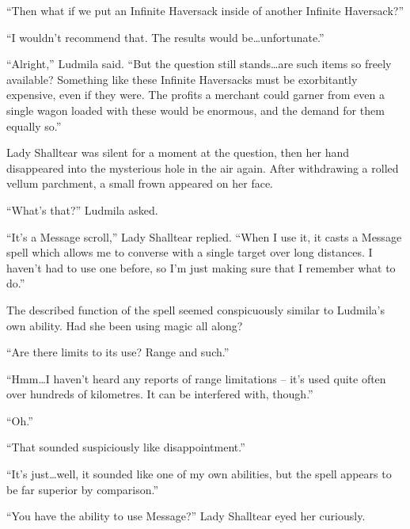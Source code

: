  

“Then what if we put an Infinite Haversack inside of another Infinite Haversack?”

 

“I wouldn’t recommend that. The results would be…unfortunate.”

 

“Alright,” Ludmila said. “But the question still stands…are such items so freely available? Something like these Infinite Haversacks must be exorbitantly expensive, even if they were. The profits a merchant could garner from even a single wagon loaded with these would be enormous, and the demand for them equally so.”

 

Lady Shalltear was silent for a moment at the question, then her hand disappeared into the mysterious hole in the air again. After withdrawing a rolled vellum parchment, a small frown appeared on her face.

 

“What’s that?” Ludmila asked.

 

“It’s a Message scroll,” Lady Shalltear replied. “When I use it, it casts a Message spell which allows me to converse with a single target over long distances. I haven’t had to use one before, so I’m just making sure that I remember what to do.”

 

The described function of the spell seemed conspicuously similar to Ludmila’s own ability. Had she been using magic all along?

 

“Are there limits to its use? Range and such.”

 

“Hmm…I haven’t heard any reports of range limitations – it’s used quite often over hundreds of kilometres. It can be interfered with, though.”

 

“Oh.”

 

“That sounded suspiciously like disappointment.”

 

“It’s just…well, it sounded like one of my own abilities, but the spell appears to be far superior by comparison.”

 

“You have the ability to use Message?” Lady Shalltear eyed her curiously.

 

